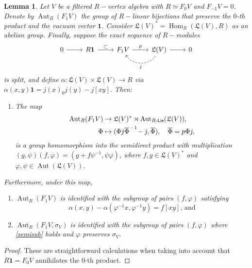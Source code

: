 \documentclass{article}
\newtheorem{lem}[thm]{Lemma}
\theoremstyle{definition}
\def\Hom{\ensuremath{\operatorname{Hom}}}
\def\Aut{\ensuremath{\operatorname{Aut}}}
\def\RLie{\ensuremath{R\text{-\textup{\textsf{Lie}}}}}
\begin{document}
\begin{lem} \label{F1}
    Let $V$ be a filtered $R-$vertex algebra with $R \simeq F_0 V$ and $F_{-1} V = 0$.
    Denote by $\Aut_R(F_1V)$ the group of $R-$linear bijections that preserve the $0$-th product and the vacuum vector $\mathbf 1$. 
    Consider $\mathfrak L(V)^\ast = \Hom_R(\mathfrak L(V),R)$ as an abelian group.
    Finally, suppose the exact sequence of $R-$modules
    \[ \begin{tikzcd} 0 \ar[r] & R \mathbf 1 \ar[r, "\subset"] & F_1 V \ar[r, "p"] & \mathfrak L(V) \ar[l, dashed, bend left = 60, "j"] \ar[r] & 0 \end{tikzcd} \]
    is split, and define $\alpha \colon \mathfrak L(V) \times \mathfrak L(V) \to R$ via $\alpha(x,y) \mathbf 1 = j(x)_0 j(y) - j [xy]$.
    Then:
    \begin{enumerate}[label = \textup{\alph*)}]
	\item \label{F1a} The map
	\begin{align*} \Aut_R(F_1 V) &\to \mathfrak L(V)^\ast \rtimes \Aut_{\RLie}(\mathfrak L(V)), \\
    \Phi &\mapsto (\Phi j \overline \Phi^{\,-1} \!-j, \overline \Phi), \quad \overline \Phi = p \Phi j, \end{align*}
	is a group homomorphism into the semidirect product with multiplication $(g, \psi) (f, \varphi) = (g + f \psi^{-1}, \psi \varphi)$,
    where $f,g \in \mathfrak L(V)^\ast$ and $\varphi, \psi \in \Aut(\mathfrak L(V))$.
    \end{enumerate}
    Furthermore, under this map,
    \begin{enumerate}[resume, label = \textup{\alph*)}]
	\item \label{F1b}  $\Aut_R(F_1 V)$ is identified with the subgroup of pairs $(f, \varphi)$ satisfying
	\begin{equation}\label{semisub} \alpha(x,y) - \alpha(\varphi^{-1} x, \varphi^{-1} y) = f[xy],\, \text{and} \end{equation}
	\item \label{F1c}  $\Aut_R(F_1 V, \sigma_V)$ is identified with the subgroup of pairs $(f, \varphi)$ where \eqref{semisub} holds and $\varphi$ preserves $\sigma_V$.
    \end{enumerate}
\end{lem}

\begin{proof} These are straightforward calculations when taking into account that $ R\mathbf 1 = F_0 V$ annihilates the $0$-th product. 
\end{proof}
\end{document}
